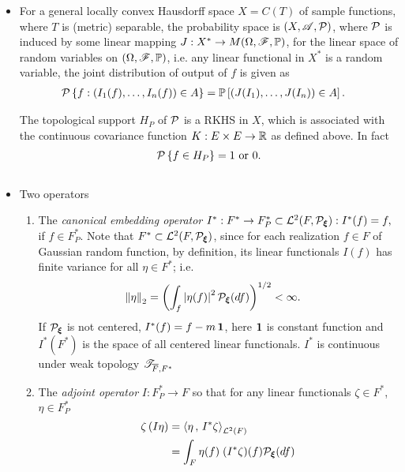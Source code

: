 \documentclass[11pt]{article}
\begin{document}
\begin{itemize}
\item \begin{remark}
For a general locally convex Hausdorff space $X=C(T)$ of sample functions, where $T$ is (metric) separable, the probability space is $(X, {\mathscr A}, {\mathcal P})$, where ${\mathcal P}$ is induced by some linear mapping $J: X^{*} \rightarrow M(\Omega, {\mathscr F}, {\mathbb P})$, for the linear space of random variables on $(\Omega, {\mathscr F}, {\mathbb P})$, i.e. any linear functional in $X^{*}$ is a random variable, the joint distribution of output of $f$ is given as 
\begin{align*}
{\mathcal P}\left\{f:  (I_{1}(f), \ldots, I_{n}(f))\in A \right\}  &={\mathbb P}\left[ (J(I_{1}), \ldots, J(I_{n}))\in A \right].
\end{align*}

The topological support $H_{P}$ of ${\mathcal P}$ is a RKHS in $X$, which is associated with the continuous covariance function $K: E\times E \rightarrow {\mathbb R}$ as defined above. In fact
\begin{align*}
{\mathcal P}\left\{ f\in H_{P} \right\} = 1 \text{ or } 0.\\[10pt]
\end{align*}
\end{remark}


 \item Two operators 
\begin{enumerate}
\item \begin{definition}
The \emph{canonical embedding operator} $I^{*}: F^{*} \rightarrow F_{P}^{*}\subset {\mathcal L}^{2}(F, {\mathcal P}_{\boldsymbol{\xi}}):  I^{*}(f) = f,$ if $f\in F_{P}^{*}$. Note that $F^{*}\subset {\mathcal L}^{2}(F, {\mathcal P}_{\boldsymbol{\xi}})$, since for each realization $f\in F$ of Gaussian random function, by definition, its linear functionals $I(f)$ has finite variance for all $\eta \in F^{*}$; i.e. 
\begin{align*}
\left\|\eta\right\|_{2} &= \left(\int_{f} \left\lvert \eta(f) \right\rvert^{2} {\mathcal P}_{\boldsymbol{\xi}}(df)\right)^{1/2} <\infty.
\end{align*} If ${\mathcal P}_{\boldsymbol{\xi}}$ is not centered, $I^{*}(f) = f- m\,\boldsymbol{1}$, here $\boldsymbol{1}$ is constant function and $I^{*}(F^{*})$ is the space of all centered linear functionals. $I^{*}$ is continuous under weak topology ${\mathscr T}_{\overline{F}, F^{*}}$
\end{definition}

\item \begin{definition}
The \emph{adjoint operator} $I: F_{P}^{*} \rightarrow F$ so that for any  linear functionals $\zeta\in F^{*}$, $\eta\in F_{P}^{*}$
\begin{align*}
\zeta\left(I \eta\right) &=\left\langle \eta\,,\, I^{*}\zeta \right\rangle_{{\mathcal L}^{2}(F)}\\
&= \int_{F}\eta(f)\; (I^{*}\zeta)(f){\mathcal P}_{\boldsymbol{\xi}}(df)
\end{align*}
\end{definition}


\end{enumerate}
\end{itemize}
\end{document}

